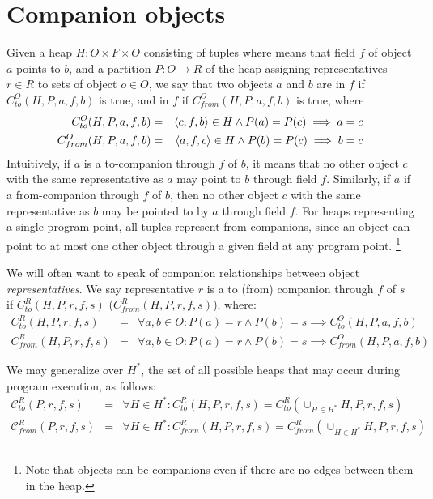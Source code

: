 \documentclass[11pt,notitlepage]{article}
\begin{document}
\section{Companion objects}
Given a heap $H: O\times F\times O$ consisting of tuples where
 means that field $f$ of object $a$ points to $b$, and a
partition $P:O\to R$ of the heap assigning representatives $r\in R$ to
sets of object $o\in O$, we say that two objects $a$ and $b$ are
 in $f$ if $C_{to}^O(H,P,a,f,b)$ is true, and
 in $f$ if $C_{from}^O(H,P,a,f,b)$ is true,
where
\begin{eqnarray*}
C_{to}^O(H,P,a,f,b) &=& \left\langle c,f,b \right\rangle\in H \wedge P(a)=P(c) \implies a=c
\\
C_{from}^O(H,P,a,f,b) &=& \left\langle a,f,c \right\rangle\in H \wedge P(b)=P(c) \implies b=c
\end{eqnarray*}
Intuitively, if $a$ is a to-companion through $f$ of $b$, it means
that no other object $c$ with the same representative as $a$ may point
to $b$ through field $f$.  Similarly, if $a$ if a from-companion
through $f$ of $b$, then no other object $c$ with the same
representative as $b$ may be pointed to by $a$ through field $f$.
For heaps representing a single program point, all tuples
 represent from-companions, since an object can point to
at most one other object through a given field at any program point.%
\footnote{Note that objects can be companions even if there are no
edges between them in the heap.}

We will often want to speak of companion relationships between object
\textit{representatives}.  We say representative $r$ is a to (from)
companion through $f$ of $s$ if $C_{to}^R(H,P,r,f,s)$
($C_{from}^R(H,P,r,f,s)$), where:
\begin{eqnarray*}
C_{to}^R(H,P,r,f,s) &=& \forall a,b\in O : P(a)=r \wedge P(b)=s \implies C_{to}^O(H,P,a,f,b)
\\
C_{from}^R(H,P,r,f,s) &=& \forall a,b\in O : P(a)=r \wedge P(b)=s \implies C_{from}^O(H,P,a,f,b)
\end{eqnarray*}

We may generalize over $H^*$, the set of all possible heaps that may occur
during program execution, as follows:
\begin{eqnarray*}
\mathcal{C}_{to}^R(P,r,f,s) &=& \forall H\in H^*: C_{to}^R(H,P,r,f,s)
 = C_{to}^R(\cup_{H\in H^*} H, P, r, f, s)
\\
\mathcal{C}_{from}^R(P,r,f,s) &=& \forall H\in H^*: C_{from}^R(H,P,r,f,s)
 = C_{from}^R(\cup_{H\in H^*} H, P, r, f, s)
\end{eqnarray*}
\end{document}
